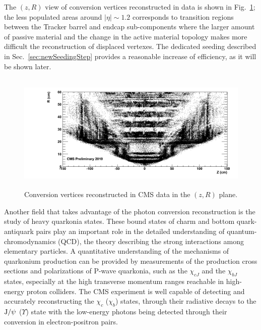 \documentclass[a4paper]{jpconf}
\def \JPsi{\rm J/\psi}
\begin{document}
%
The  $(z, R)$  view of conversion vertices reconstructed in data is  shown in Fig.~\ref{fig:convRZ};  the less populated
areas  around $|\eta|\sim1.2$ corresponds to transition regions between the Tracker
barrel and endcap sub-components where the larger amount of passive material and the change in the active material topology makes more difficult the reconstruction of displaced vertexes. 
The dedicated seeding described in Sec.~\ref{sec:newSeedingStep} provides a reasonable increase of efficiency, as it will be shown later.


\begin{figure}[h!]
  \begin{center}
     \includegraphics[width=17cm,height=5.7cm]{fig/conversions/ptCut/data_rz.png}
      \caption{Conversion vertices reconstructed in CMS data in the $(z,R)$ plane.}
    \label{fig:convRZ}
  \end{center}
\end{figure}



Another field that takes advantage of the photon conversion reconstruction is the study of heavy quarkonia states. These bound states of charm and bottom quark-antiquark pairs play an important role in the detailed understanding of quantum-chromodynamics 
(QCD), the theory describing the strong interactions among elementary particles. 
A quantitative understanding of the mechanisms of quarkonium production can
be provided by measurements of the production cross sections and 
polarizations of P-wave quarkonia, such as the $\chi_{cJ}$ and the 
$\chi_{bJ}$ states, especially at the high transverse momentum ranges
reachable in high-energy proton colliders.
The CMS experiment is well capable 
of detecting and accurately reconstructing the $\chi_{c}$ ($\chi_{b}$)
states, through their radiative decays to the $\JPsi$ ($\Upsilon$)
state with the low-energy photons being detected through their conversion 
in electron-positron pairs. 
\end{document}
